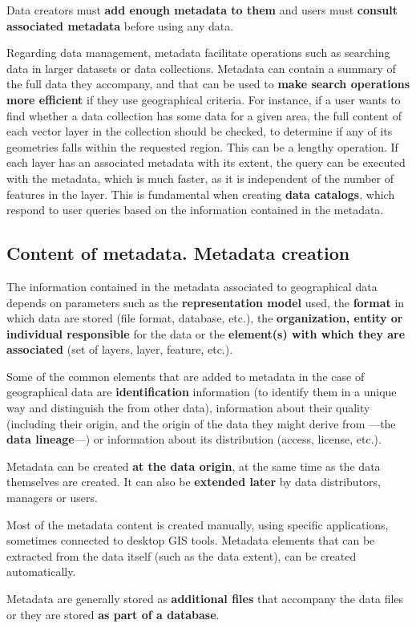 Data creators must \textbf{add enough metadata to them} and users must \textbf{consult associated metadata} before using any data.

Regarding data management, metadata facilitate operations such as searching data in larger datasets or data collections. Metadata can contain a summary of the full data they accompany, and that can be used to \textbf{make search operations more efficient} if they use geographical criteria. For instance, if a user wants to find whether a data collection has some data for a given area, the full content of each vector layer in the collection should be checked, to determine if any of its geometries falls within the requested region. This can be a lengthy operation. If each layer has an associated metadata with its extent, the query can be executed with the metadata, which is much faster, as it is independent of the number of features in the layer. This is fundamental when creating \textbf{data catalogs}, which respond to user queries based on the information contained in the metadata.


\subsection{Content of metadata. Metadata creation}

The information contained in the metadata associated to geographical data depends on parameters such as the \textbf{representation model} used, the \textbf{format} in which data are stored (file format, database, etc.), the \textbf{organization, entity or individual responsible} for the data or the \textbf{element(s) with which they are associated} (set of layers, layer, feature, etc.).

Some of the common elements that are added to metadata in the case of geographical data are \textbf{identification} information (to identify them in a unique way and distinguish the from other data), information about their quality (including their origin, and the origin of the data they might derive from ---the \textbf{data lineage}---) or information about its distribution (access, license, etc.).
 
Metadata can be created \textbf{at the data origin}, at the same time as the data themselves are created. It can also be \textbf{extended later} by data distributors, managers or users.

Most of the metadata content is created manually, using specific applications, sometimes connected to desktop GIS tools. Metadata elements that can be extracted from the data itself (such as the data extent), can be created automatically.

Metadata are generally stored as \textbf{additional files} that accompany the data files or they are stored \textbf{as part of a database}.


\pagestyle{empty}
